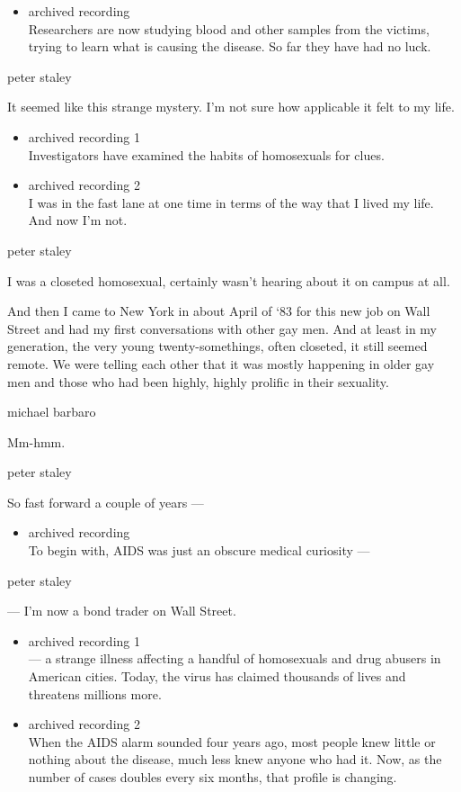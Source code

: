 \begin{itemize}
\tightlist
\item
  archived recording\\
  Researchers are now studying blood and other samples from the victims,
  trying to learn what is causing the disease. So far they have had no
  luck.
\end{itemize}

peter staley

It seemed like this strange mystery. I'm not sure how applicable it felt
to my life.

\begin{itemize}
\item
  archived recording 1\\
  Investigators have examined the habits of homosexuals for clues.
\item
  archived recording 2\\
  I was in the fast lane at one time in terms of the way that I lived my
  life. And now I'm not.
\end{itemize}

peter staley

I was a closeted homosexual, certainly wasn't hearing about it on campus
at all.

And then I came to New York in about April of `83 for this new job on
Wall Street and had my first conversations with other gay men. And at
least in my generation, the very young twenty-somethings, often
closeted, it still seemed remote. We were telling each other that it was
mostly happening in older gay men and those who had been highly, highly
prolific in their sexuality.

michael barbaro

Mm-hmm.

peter staley

So fast forward a couple of years ---

\begin{itemize}
\tightlist
\item
  archived recording\\
  To begin with, AIDS was just an obscure medical curiosity ---
\end{itemize}

peter staley

--- I'm now a bond trader on Wall Street.

\begin{itemize}
\item
  archived recording 1\\
  --- a strange illness affecting a handful of homosexuals and drug
  abusers in American cities. Today, the virus has claimed thousands of
  lives and threatens millions more.
\item
  archived recording 2\\
  When the AIDS alarm sounded four years ago, most people knew little or
  nothing about the disease, much less knew anyone who had it. Now, as
  the number of cases doubles every six months, that profile is
  changing.
\end{itemize}

